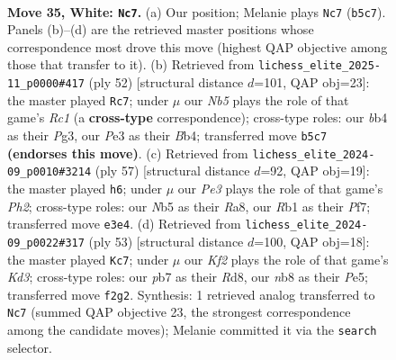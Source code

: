 \documentclass[11pt]{article}
\begin{document}
\clearpage

\begin{figure}[p]\centering
\begin{subfigure}{0.46\textwidth}\centering
\resizebox{\linewidth}{!}{%
\newchessgame
\chessboard[
  setfen={1nb2k2/1p1n4/r4p2/pN1p2p1/1b4Pp/1P2P2P/PB2PK2/1R1B4 w - - 4 35},
  showmover=false,
  pgfstyle=straightmove, color=movearrow, markmove={b5-c7}
]}
\caption{}
\end{subfigure}\hfill
\begin{subfigure}{0.46\textwidth}\centering
\resizebox{\linewidth}{!}{%
\newchessgame
\chessboard[
  setfen={3r2k1/p2n1pp1/4pn1p/Pp1p4/1B1P4/3P2P1/5PBP/2R3K1 w - - 1 27},
  showmover=false,
  pgfstyle=straightmove, color=movearrow, markmove={c1-c7}
]}
\caption{}
\end{subfigure}
\\[4pt]
\begin{subfigure}{0.46\textwidth}\centering
\resizebox{\linewidth}{!}{%
\newchessgame
\chessboard[
  setfen={r5k1/5ppp/3B1b2/1pPp4/pn1P2P1/4PN2/1P5P/4R1K1 b - - 0 29},
  showmover=false,
  pgfstyle=straightmove, color=movearrow, markmove={h7-h6}
]}
\caption{}
\end{subfigure}\hfill
\begin{subfigure}{0.46\textwidth}\centering
\resizebox{\linewidth}{!}{%
\newchessgame
\chessboard[
  setfen={3r4/5p2/2bk1p2/4pP1p/1P2P2P/P1pBN2R/6P1/1K2b3 b - - 0 27},
  showmover=false,
  pgfstyle=straightmove, color=movearrow, markmove={d6-c7}
]}
\caption{}
\end{subfigure}
\caption{\textbf{Move 35, White: \texttt{Nc7}.} (a) Our position; Melanie plays \texttt{Nc7} (\texttt{b5c7}). Panels (b)--(d) are the retrieved master positions whose correspondence most drove this move (highest QAP objective among those that transfer to it). (b) Retrieved from \texttt{lichess\_elite\_2025-11\_p0000\#417} (ply 52) [structural distance $d$=101, QAP obj=23]: the master played \texttt{Rc7}; under $\mu$ our \emph{Nb5} plays the role of that game's \emph{Rc1} (a \textbf{cross-type} correspondence); cross-type roles: our \emph{b}b4 as their \emph{P}g3, our \emph{P}e3 as their \emph{B}b4; transferred move \texttt{b5c7} \textbf{(endorses this move)}. (c) Retrieved from \texttt{lichess\_elite\_2024-09\_p0010\#3214} (ply 57) [structural distance $d$=92, QAP obj=19]: the master played \texttt{h6}; under $\mu$ our \emph{Pe3} plays the role of that game's \emph{Ph2}; cross-type roles: our \emph{N}b5 as their \emph{R}a8, our \emph{R}b1 as their \emph{P}f7; transferred move \texttt{e3e4}. (d) Retrieved from \texttt{lichess\_elite\_2024-09\_p0022\#317} (ply 53) [structural distance $d$=100, QAP obj=18]: the master played \texttt{Kc7}; under $\mu$ our \emph{Kf2} plays the role of that game's \emph{Kd3}; cross-type roles: our \emph{p}b7 as their \emph{R}d8, our \emph{n}b8 as their \emph{P}e5; transferred move \texttt{f2g2}. Synthesis: 1 retrieved analog transferred to \texttt{Nc7} (summed QAP objective 23, the strongest correspondence among the candidate moves); Melanie committed it via the \texttt{search} selector.}
\label{fig:thought-m68}
\end{figure}
\end{document}
